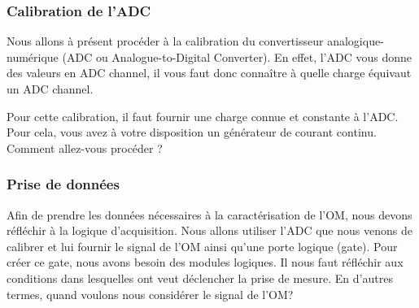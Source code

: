 
\subsubsection{Calibration de l'ADC}
Nous allons à présent procéder à la calibration du convertisseur analogique-numérique (ADC ou Analogue-to-Digital Converter). En effet, l'ADC vous donne des valeurs en ADC channel, il vous faut donc connaître à quelle charge équivaut un ADC channel.

Pour cette calibration, il faut fournir une charge connue et constante à l'ADC. Pour cela, vous avez à votre disposition un générateur de courant continu. Comment allez-vous procéder ? 


\subsubsection{Prise de données}
Afin de prendre les données nécessaires à la caractérisation de l'OM, nous devons réfléchir à la logique d'acquisition. Nous allons utiliser l'ADC que nous venons de calibrer et lui fournir le signal de l'OM ainsi qu'une porte logique (gate). Pour créer ce gate, nous avons besoin des modules logiques. Il nous faut réfléchir aux conditions dans lesquelles ont veut déclencher la prise de mesure. En d'autres termes, quand voulons nous considérer le signal de l'OM?

